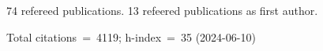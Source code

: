 74 refereed publications. 13 refeered publications as first author.

Total citations~=~4119; h-index~=~35 (2024-06-10)